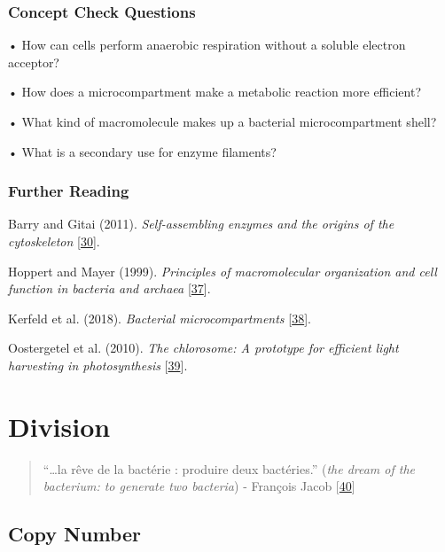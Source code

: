 \documentclass[]{tufte-book}
\begin{document}
\hypertarget{concept-check-questions-3}{%
\subsection*{Concept Check Questions}\label{concept-check-questions-3}}

• How can cells perform anaerobic respiration without a soluble electron acceptor?

• How does a microcompartment make a metabolic reaction more efficient?

• What kind of macromolecule makes up a bacterial microcompartment shell?

• What is a secondary use for enzyme filaments?

\hypertarget{further-reading-3}{%
\subsection*{Further Reading}\label{further-reading-3}}

Barry and Gitai (2011). \emph{Self-assembling enzymes and the origins of the cytoskeleton} {[}\protect\hyperlink{ref-barry2011}{30}{]}.

Hoppert and Mayer (1999). \emph{Principles of macromolecular organization and cell function in bacteria and archaea} {[}\protect\hyperlink{ref-hoppert1999}{37}{]}.

Kerfeld et al. (2018). \emph{Bacterial microcompartments} {[}\protect\hyperlink{ref-kerfeld2018}{38}{]}.

Oostergetel et al. (2010). \emph{The chlorosome: A prototype for efficient light harvesting in photosynthesis} {[}\protect\hyperlink{ref-oostergetel2010}{39}{]}.

\hypertarget{division}{%
\chapter{Division}\label{division}}

\begin{quote}
``\ldots{}la rêve de la bactérie : produire deux bactéries.'' (\emph{the dream of the bacterium: to generate two bacteria})
- François Jacob {[}\protect\hyperlink{ref-jacob2002a}{40}{]}
\end{quote}

\hypertarget{copy-number}{%
\section{Copy Number}\label{copy-number}}
\end{document}
